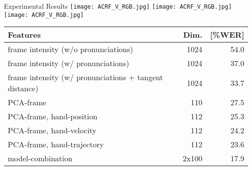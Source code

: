 \documentclass[final,t]{beamer}
\begin{document}
\begin{frame}{}
\begin{columns}[t]
    
    \begin{column}{.3\linewidth}

      \begin{block}{Experimental Results}
        \centering
        \texttt{[image: ACRF\_V\_RGB.jpg]}%
        \texttt{[image: ACRF\_V\_RGB.jpg]}%
        \texttt{[image: ACRF\_V\_RGB.jpg]}%

        \begin{table}
          \centering
          \begin{tabular}{@{} p{.7\linewidth} r r @{}}
            \toprule
            Features                                                             & Dim.            & [\%WER] \\
            \midrule
            frame intensity (w/o pronunciations)                                 & 1024            & 54.0    \\%
            frame intensity (w/ pronunciations)                                  & 1024            & 37.0    \\
            frame intensity (w/ pronunciations + tangent distance)               & 1024            & 33.7    \\%
            PCA-frame                                                            & 110             & 27.5    \\
            PCA-frame, hand-position                                             & 112             & 25.3    \\
            PCA-frame, hand-velocity                                             & 112             & 24.2    \\
            PCA-frame, hand-trajectory                                           & 112             & 23.6    \\
            \addlinespace
            \addlinespace
            model-combination                                                    & 2x100           & 17.9    \\
            \bottomrule
          \end{tabular}
          \label{tab:baseline-results}
        \end{table}
      \end{block}
      

\end{column}
\end{columns}
\end{frame}
\end{document}
